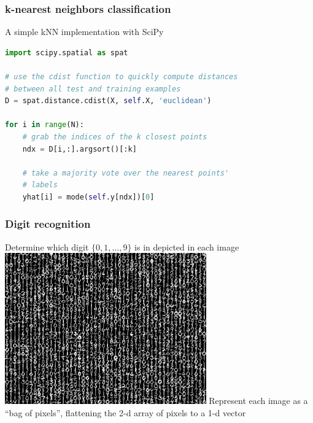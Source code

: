 \begin{frame}[fragile]
  \frametitle{k-nearest neighbors classification}

  \begin{center}
    \begin{block}{A simple kNN implementation with SciPy}
        \begin{lstlisting}[language=python]
import scipy.spatial as spat

# use the cdist function to quickly compute distances
# between all test and training examples
D = spat.distance.cdist(X, self.X, 'euclidean')

for i in range(N):
    # grab the indices of the k closest points
    ndx = D[i,:].argsort()[:k]

    # take a majority vote over the nearest points'
    # labels
    yhat[i] = mode(self.y[ndx])[0]
        \end{lstlisting}
    \end{block}
  \end{center}
\end{frame}


\begin{frame}
  \frametitle{Digit recognition}

  \begin{center}
    Determine which digit $\{0,1,\ldots,9\}$ is in depicted in each image
    \vskip10pt
    \includegraphics[width=0.65\textwidth]{../../code/image_data/sample_digits.png}
    \vskip10pt
    Represent each image as a ``bag of pixels'', flattening the 2-d array
    of pixels to a 1-d vector

  \end{center}
\end{frame}


